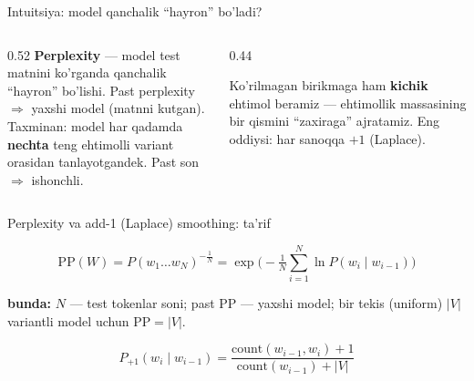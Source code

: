 \documentclass[aspectratio=169,11pt]{beamer}
\newcommand{\bunda}[1]{{\small\textbf{bunda:}\; #1}}
\begin{document}
\begin{frame}{Intuitsiya: model qanchalik ``hayron'' bo'ladi?}
  \begin{columns}[T]
    \begin{column}{0.52\textwidth}
      \small
      \textbf{Perplexity} --- model test matnini ko'rganda qanchalik
      ``hayron'' bo'lishi. Past perplexity $\Rightarrow$ yaxshi model
      (matnni kutgan).\\[6pt]
      Taxminan: model har qadamda \textbf{nechta} teng ehtimolli variant
      orasidan tanlayotgandek. Past son $\Rightarrow$ ishonchli.
    \end{column}
    \begin{column}{0.44\textwidth}
      \begin{tcolorbox}[defbox,title=Smoothing,top=2pt,bottom=2pt]
        \footnotesize
        Ko'rilmagan birikmaga ham \textbf{kichik} ehtimol beramiz ---
        ehtimollik massasining bir qismini ``zaxiraga'' ajratamiz.
        Eng oddiysi: har sanoqqa $+1$ (Laplace).
      \end{tcolorbox}
    \end{column}
  \end{columns}
\end{frame}

\begin{frame}{Perplexity va add-1 (Laplace) smoothing: ta'rif}
  \begin{tcolorbox}[defbox,title=Ta'rif: perplexity]
    \vspace{-0.4em}
    $$ \mathrm{PP}(W) = P(w_1\ldots w_N)^{-\frac{1}{N}}
       = \exp\!\Big(\!-\tfrac{1}{N}\textstyle\sum_{i=1}^{N}\ln P(w_i\mid w_{i-1})\Big) $$
  \end{tcolorbox}
  \vspace{2pt}
  \bunda{$N$ --- test tokenlar soni; past $\mathrm{PP}$ --- yaxshi model;
  bir tekis (uniform) $|V|$ variantli model uchun $\mathrm{PP}=|V|$.}
  \vspace{4pt}
  \begin{tcolorbox}[defbox,title=Ta'rif: add-1 (Laplace) smoothing]
    \vspace{-0.4em}
    $$ P_{+1}(w_i\mid w_{i-1}) = \frac{\text{count}(w_{i-1},w_i) + 1}{\text{count}(w_{i-1}) + |V|} $$
  \end{tcolorbox}
\end{frame}
\end{document}
